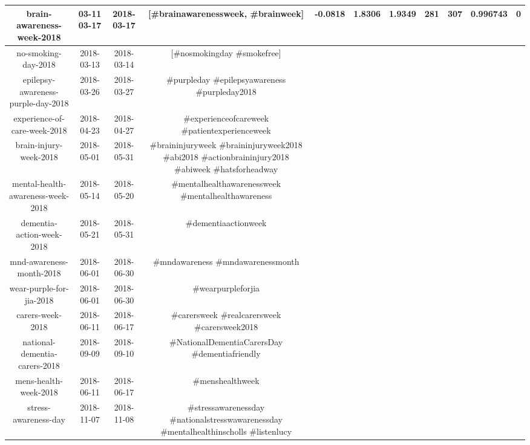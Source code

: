 \documentclass[runningheads]{llncs}
\begin{document}
\begin{table}
{\begin{tabular}{|c|c|c|c|c|c|c|c|c|c|c|}
			\hline 
			\rule[-1ex]{0pt}{2.5ex}  brain-awareness-week-2018	& 03-11	03-17	& 2018-03-17 &	[\#brainawarenessweek, \#brainweek]& -0.0818	 &  1.8306	& 1.9349	& 281	& 307	& 0.996743 & 0 \\
			\hline 
			\rule[-1ex]{0pt}{2.5ex}  no-smoking-day-2018 & 2018-03-13  & 2018-03-14 & [\#nosmokingday \#smokefree]    & & & & & \\ 
			\hline 
			\rule[-1ex]{0pt}{2.5ex}  epilepsy-awareness-purple-day-2018 & 2018-03-26  & 2018-03-27 & \#purpleday \#epilepsyawareness \#purpleday2018    & & & & & \\ 
			\hline 
			\rule[-1ex]{0pt}{2.5ex}  experience-of-care-week-2018 & 2018-04-23  & 2018-04-27 & \#experienceofcareweek \#patientexperienceweek    & & & & & \\ 
			\hline 
			\rule[-1ex]{0pt}{2.5ex}  brain-injury-week-2018               & 2018-05-01  & 2018-05-31 & \#braininjuryweek \#braininjuryweek2018 \#abi2018 \#actionbraininjury2018 \#abiweek \#hatsforheadway    & & & & & \\ 
			\hline 
			\rule[-1ex]{0pt}{2.5ex}  mental-health-awareness-week-2018    & 2018-05-14  & 2018-05-20 & \#mentalhealthawarenessweek \#mentalhealthawareness      & & & & & \\ 
			\hline 
			\rule[-1ex]{0pt}{2.5ex}  dementia-action-week-2018  & 2018-05-21  & 2018-05-31 & \#dementiaactionweek      & & & & & \\ 
			\hline 
			\rule[-1ex]{0pt}{2.5ex}  mnd-awareness-month-2018 & 2018-06-01  & 2018-06-30 & \#mndawareness \#mndawarenessmonth         & & & & & \\ 
			\hline
			\rule[-1ex]{0pt}{2.5ex}   wear-purple-for-jia-2018             & 2018-06-01  & 2018-06-30 & \#wearpurpleforjia         & & & & & \\ 
			\hline 
			\rule[-1ex]{0pt}{2.5ex}   carers-week-2018                     & 2018-06-11  & 2018-06-17 & \#carersweek \#realcarersweek \#carersweek2018        & & & & & \\ 
			\hline 
			\rule[-1ex]{0pt}{2.5ex}  national-dementia-carers-2018        & 2018-09-09  & 2018-09-10 & \#NationalDementiaCarersDay \#dementiafriendly           & & & & & \\ 
			\hline 
			\rule[-1ex]{0pt}{2.5ex}  mens-health-week-2018                & 2018-06-11  & 2018-06-17 & \#menshealthweek           & & & & & \\ 
			\hline 
			\rule[-1ex]{0pt}{2.5ex}  stress-awareness-day                 & 2018-11-07  & 2018-11-08 & \#stressawarenessday \#nationalstresswawarenessday \#mentalhealthinscholls \#listenlucy             & & & & & \\ 

\end{tabular}}
\end{table}
\end{document}
